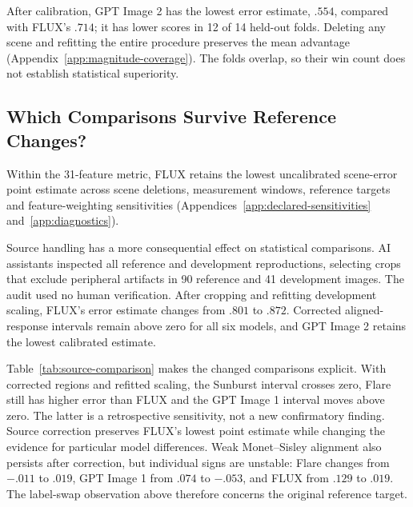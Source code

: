 After calibration, GPT Image 2 has the lowest error estimate, $.554$,
compared with FLUX's $.714$; it has lower scores in 12 of 14 held-out folds.
Deleting any scene and refitting the entire procedure preserves the mean
advantage (Appendix~\ref{app:magnitude-coverage}).
The folds overlap, so their win count does not establish statistical superiority.

\subsection{Which Comparisons Survive Reference Changes?}\label{sec:source-correction}
Within the 31-feature metric, FLUX retains the lowest uncalibrated scene-error point
estimate across scene deletions, measurement windows, reference targets and
feature-weighting sensitivities (Appendices~\ref{app:declared-sensitivities}
and~\ref{app:diagnostics}).

Source handling has a more consequential effect on statistical comparisons.
AI assistants inspected all reference and development reproductions, selecting
crops that exclude peripheral artifacts in 90 reference and 41 development images.
The audit used no human verification. After cropping and refitting development scaling,
FLUX's error estimate changes from $.801$ to $.872$. Corrected aligned-response
intervals remain above zero for all six models, and GPT Image 2 retains the lowest
calibrated estimate.

Table~\ref{tab:source-comparison} makes the changed comparisons explicit. With
corrected regions and refitted scaling, the Sunburst interval crosses zero,
Flare still has higher error than FLUX and the GPT Image 1 interval moves above zero. The latter
is a retrospective sensitivity, not a new confirmatory finding. Source correction
preserves FLUX's lowest point estimate while changing the evidence for particular
model differences.
Weak Monet--Sisley alignment also persists after correction, but individual
signs are unstable: Flare changes from $-.011$ to $.019$, GPT Image 1 from
$.074$ to $-.053$, and FLUX from $.129$ to $.019$. The label-swap observation
above therefore concerns the original reference target.


